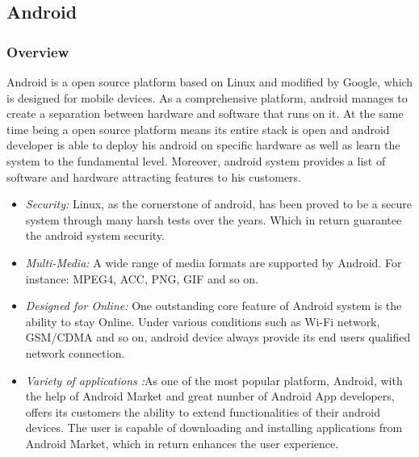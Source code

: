 \documentclass[]{llncs}
\begin{document}
\subsection{Android}
\subsubsection{Overview}
Android is a open source platform based on Linux and modified by Google, which is designed for mobile devices. As a comprehensive platform, android manages to create a separation between hardware and software that runs on it.  At the same time being a open source platform means its entire stack is open and android developer is able to deploy his android on specific hardware as well as learn the system to the fundamental level.\cite{learn_android}
Moreover, android system provides a list of software and hardware attracting features to his customers.
 \begin{itemize}
\item \emph{Security:} Linux, as the cornerstone of android, has been proved to be a secure system through many harsh tests over the years. Which in return guarantee the android system security. \cite{learn_android}
\item \emph{Multi-Media:} A wide range of media formats are supported by Android. For instance: MPEG4, ACC, PNG, GIF and so on. \cite{android_media}
\item \emph{Designed for Online:} One outstanding core feature of Android system is the ability to stay Online\cite{android_forensics}. Under various conditions such as Wi-Fi network, GSM/CDMA and so on, android device always provide its end users qualified network  connection.
\item \emph{Variety of applications :}As one of the most popular platform,  Android, with the help of Android Market and great number of Android App developers, offers its customers the ability to extend  functionalities of  their android devices\cite{android_forensics}. The user is capable of downloading and installing applications from Android Market, which in return enhances the  user experience.
\end{itemize}
\end{document}
